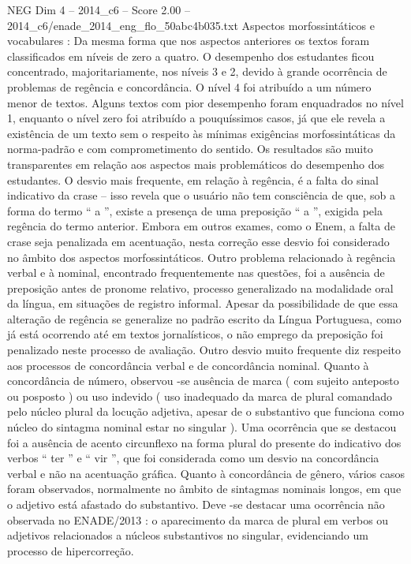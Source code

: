 \begin{textsample}{NEG Dim 4 – 2014\_c6 – Score 2.00 – 2014\_c6/enade\_2014\_eng\_flo\_50abc4b035.txt}
Aspectos morfossintáticos e vocabulares : Da mesma forma que nos aspectos anteriores os textos foram classificados em níveis de zero a quatro.
O desempenho dos estudantes ficou concentrado, majoritariamente, nos níveis 3 e 2, devido à grande ocorrência de problemas de regência e concordância.
O nível 4 foi atribuído a um número menor de textos.
Alguns textos com pior desempenho foram enquadrados no nível 1, enquanto o nível zero foi atribuído a pouquíssimos casos, já que ele revela a existência de um texto sem o respeito às mínimas exigências morfossintáticas da norma-padrão e com comprometimento do sentido.
Os resultados são muito transparentes em relação aos aspectos mais problemáticos do desempenho dos estudantes.
O desvio mais frequente, em relação à regência, é a falta do sinal indicativo da crase – isso revela que o usuário não tem consciência de que, sob a forma do termo “ a ”, existe a presença de uma preposição “ a ”, exigida pela regência do termo anterior.
Embora em outros exames, como o Enem, a falta de crase seja penalizada em acentuação, nesta correção esse desvio foi considerado no âmbito dos aspectos morfossintáticos.
Outro problema relacionado à regência verbal e à nominal, encontrado frequentemente nas questões, foi a ausência de preposição antes de pronome relativo, processo generalizado na modalidade oral da língua, em situações de registro informal.
Apesar da possibilidade de que essa alteração de regência se generalize no padrão escrito da Língua Portuguesa, como já está ocorrendo até em textos jornalísticos, o não emprego da preposição foi penalizado neste processo de avaliação.
Outro desvio muito frequente diz respeito aos processos de concordância verbal e de concordância nominal.
Quanto à concordância de número, observou -se ausência de marca ( com sujeito anteposto ou posposto ) ou uso indevido ( uso inadequado da marca de plural comandado pelo núcleo plural da locução adjetiva, apesar de o substantivo que funciona como núcleo do sintagma nominal estar no singular ).
Uma ocorrência que se destacou foi a ausência de acento circunflexo na forma plural do presente do indicativo dos verbos “ ter ” e “ vir ”, que foi considerada como um desvio na concordância verbal e não na acentuação gráfica.
Quanto à concordância de gênero, vários casos foram observados, normalmente no âmbito de sintagmas nominais longos, em que o adjetivo está afastado do substantivo.
Deve -se destacar uma ocorrência não observada no ENADE/2013 : o aparecimento da marca de plural em verbos ou adjetivos relacionados a núcleos substantivos no singular, evidenciando um processo de hipercorreção.

\end{textsample}
